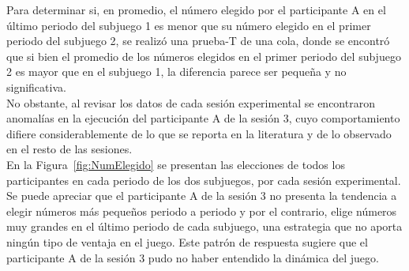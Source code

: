 Para determinar si, en promedio, el número elegido por el participante A en el último periodo del subjuego 1 es menor que su número elegido en el primer periodo del subjuego 2, se realizó una prueba-T de una cola, donde se encontró que si bien el promedio de los números elegidos en el primer periodo del subjuego 2 es mayor que en el subjuego 1, la diferencia parece ser pequeña y no significativa.\\

No obstante, al revisar los datos de cada sesión experimental se encontraron anomalías en la ejecución del participante A de la sesión 3, cuyo comportamiento difiere considerablemente de lo que se reporta en la literatura y de lo observado en el resto de las sesiones.\\

En la Figura~\ref{fig:NumElegido} se presentan las elecciones de todos los participantes en cada periodo de los dos subjuegos, por cada sesión experimental. Se puede apreciar que el participante A de la sesión 3 no presenta la tendencia a elegir números más pequeños periodo a periodo y por el contrario, elige números muy grandes en el último periodo de cada subjuego, una estrategia que no aporta ningún tipo de ventaja en el juego. Este patrón de respuesta sugiere que el participante A de la sesión 3 pudo no haber entendido la dinámica del juego.\\

